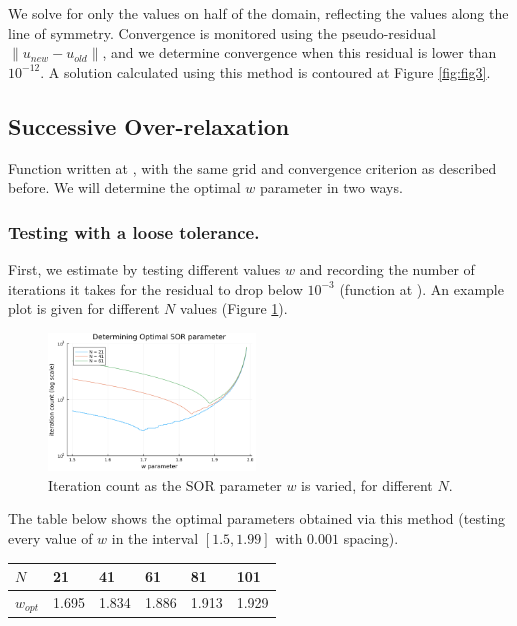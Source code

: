 \documentclass{article}
\numberwithin{equation}{section}
\theoremstyle{definition}
\begin{document}
We solve for only the values on half of the domain, reflecting the values along the line of symmetry. Convergence is monitored using the pseudo-residual $\|u_{new} - u_{old}\|$, and we determine convergence when this residual is lower than $10^{-12}$. A solution calculated using this method is contoured at Figure \ref{fig:fig3}.

\subsection{Successive Over-relaxation}
Function written at , with the same grid and convergence criterion as described before. We will determine the optimal $w$ parameter in two ways.

\subsubsection{Testing with a loose tolerance.}
First, we estimate by testing different values $w$ and recording the number of iterations it takes for the residual to drop below $10^{-3}$ (function at ). An example plot is given for different $N$ values (Figure \ref{fig:figsor1}).

\begin{figure}[H]
    \centering
    \includegraphics[width=0.49\textwidth]{figsor1.png}
    \caption{Iteration count as the SOR parameter $w$ is varied, for different $N$.}
    \label{fig:figsor1}
\end{figure}

The table below shows the optimal parameters obtained via this method (testing every value of $w$ in the interval $[1.5, 1.99]$ with $0.001$ spacing).

\begin{table}[H]
    \centering
    \begin{tabular}{|l|l|l|l|l|l|}
    \hline
    $N$       & 21    & 41    & 61    & 81    & 101   \\ \hline
    $w_{opt}$ & 1.695 & 1.834 & 1.886 & 1.913 & 1.929 \\ \hline
    \end{tabular}
\end{table}
\end{document}
